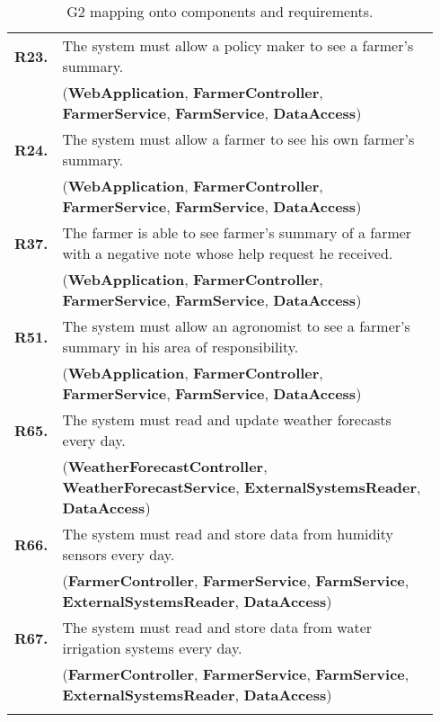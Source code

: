 \begin{longtable}{p{0.06\linewidth} p{0.88\linewidth}}
	\textbf{R23.} & The system must allow a policy maker to see a farmer's summary.\\
	& (\textbf{WebApplication}, \textbf{FarmerController}, \textbf{FarmerService},
	\textbf{FarmService},
	\textbf{DataAccess})\\
	
	\textbf{R24.} & The system must allow a farmer to see his own farmer's summary.\\
	& (\textbf{WebApplication}, \textbf{FarmerController}, \textbf{FarmerService},
	\textbf{FarmService}, \textbf{DataAccess})\\
	\textbf{R37.} & The farmer is able to see farmer's summary of a farmer with a negative note whose help request he received. \\
	& (\textbf{WebApplication}, \textbf{FarmerController}, \textbf{FarmerService},
	\textbf{FarmService}, \textbf{DataAccess})\\

	\textbf{R51.} & The system must allow an agronomist to see a farmer's summary in his area of responsibility.\\
	& (\textbf{WebApplication}, \textbf{FarmerController}, \textbf{FarmerService},
	\textbf{FarmService}, \textbf{DataAccess})\\

	\textbf{R65.} & The system must read and update weather forecasts every day. \\
	& (\textbf{WeatherForecastController}, \textbf{WeatherForecastService}, \textbf{ExternalSystemsReader},
	\textbf{DataAccess})\\
	\textbf{R66.} & The system must read and store data from humidity sensors every day. \\
	& (\textbf{FarmerController}, \textbf{FarmerService}, \textbf{FarmService}, \textbf{ExternalSystemsReader},
	\textbf{DataAccess})\\
	\textbf{R67.} & The system must read and store data from water irrigation systems every day. \\
	& (\textbf{FarmerController}, \textbf{FarmerService}, \textbf{FarmService}, \textbf{ExternalSystemsReader},
	\textbf{DataAccess})\\
	
    \bottomrule
    \caption{G2 mapping onto components and requirements.}
\end{longtable}

